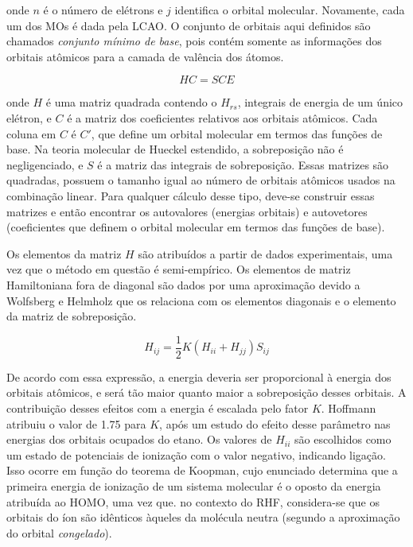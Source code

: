 \noindent onde $n$ é o número de elétrons e $j$ identifica o orbital molecular. Novamente, cada um dos \gls{MOs} é dada pela LCAO. O conjunto de orbitais aqui definidos são chamados \textit{conjunto mínimo de base}, pois contém somente as informações dos orbitais atômicos para a camada de valência dos átomos. 

\begin{equation}
    HC = SCE
\end{equation}

\noindent onde $H$ é uma matriz quadrada contendo o $H_{rs}$, integrais de energia de um único elétron, e $C$ é a matriz dos coeficientes relativos aos orbitais atômicos. Cada coluna em $C$ é $C'$, que define um orbital molecular em termos das funções de base. Na teoria molecular de Hueckel estendido, a sobreposição não é negligenciado, e $S$ é a matriz das integrais de sobreposição. Essas matrizes são quadradas, possuem o tamanho igual ao número de orbitais atômicos usados na combinação linear. Para qualquer cálculo desse tipo, deve-se construir essas matrizes e então encontrar os autovalores (energias orbitais) e autovetores (coeficientes que definem o orbital molecular em termos das funções de base).

Os elementos da matriz $H$ são atribuídos a partir de dados experimentais, uma vez que o método em questão é semi-empírico. Os elementos de matriz Hamiltoniana fora de diagonal são dados por uma aproximação devido a Wolfsberg e Helmholz
que os relaciona com os elementos diagonais e o elemento da matriz de sobreposição.

\begin{equation}
    H_{ij} = \frac{1}{2} K(H_{ii} + H_{jj}) S_{ij}
\end{equation}

De acordo com essa expressão, a energia deveria ser proporcional à energia dos orbitais atômicos, e será tão maior quanto maior a sobreposição desses orbitais. A contribuição desses efeitos com a energia é escalada pelo fator $K$. Hoffmann \autocite{Hoffmann1963} atribuiu o valor de 1.75 para $K$, após um estudo do efeito desse parâmetro nas energias dos orbitais ocupados do etano. Os valores de $H_{ii}$ são escolhidos como um estado de potenciais de ionização com o valor negativo, indicando ligação. Isso ocorre em função do teorema de Koopman\autocite{Koopmans1934}, cujo enunciado determina que a primeira energia de ionização de um sistema molecular é o oposto da energia atribuída ao \gls{HOMO}, uma vez que. no contexto do \gls{RHF}, considera-se que os orbitais do íon são idênticos àqueles da molécula neutra (segundo a aproximação do orbital \textit{congelado}). 

